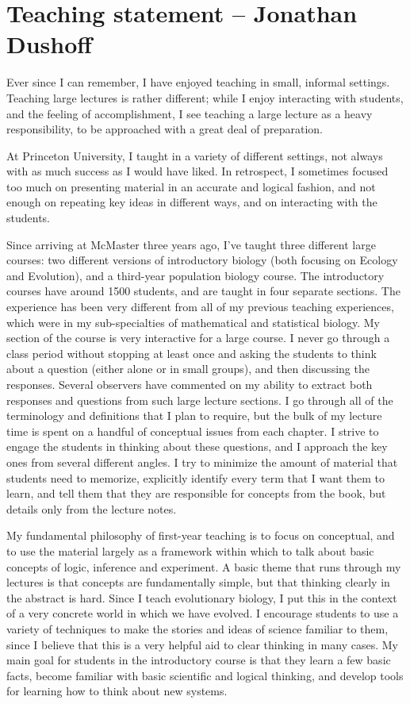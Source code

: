 \documentclass[12pt]{article}
\begin{document}
\section*{Teaching statement -- Jonathan Dushoff }

Ever since I can remember, I have enjoyed teaching in small, informal settings.  
Teaching large lectures is rather different; while I enjoy interacting with students, and the feeling of accomplishment, I see teaching a large lecture as a heavy responsibility, to be approached with a great deal of preparation.

At Princeton University, I taught in a variety of different settings, not always with as much success as I would have liked.
In retrospect, I sometimes focused too much on presenting material in an accurate and logical fashion, and not enough on repeating key ideas in different ways, and on interacting with the students.

Since arriving at McMaster three years ago, I've taught three different large courses: two different versions of introductory biology (both focusing on Ecology and Evolution), and a third-year population biology course.  
The introductory courses have around 1500 students, and are taught in four separate sections.  The experience has been very different from all of my previous teaching experiences, which were in my sub-specialties of mathematical and statistical biology.  
My section of the course is very interactive for a large course.
I never go through a class period without stopping at least once and asking the students to think about a question (either alone or in small groups), and then discussing the responses.
Several observers have commented on my ability to extract both responses and questions from such large lecture sections.
I go through all of the terminology and definitions that I plan to require, but the bulk of my lecture time is spent on a handful of conceptual issues from each chapter.
I strive to engage the students in thinking about these questions, and I approach the key ones from several different angles.
I try to minimize the amount of material that students need to memorize, explicitly identify every term that I want them to learn, and tell them that they are responsible for concepts from the book, but details only from the lecture notes.

My fundamental philosophy of first-year teaching is to focus on conceptual, and to use the material largely as a framework within which to talk about basic concepts of logic, inference and experiment.  A basic theme that runs through my lectures is that concepts are fundamentally simple, but that thinking clearly in the abstract is hard.  Since I teach evolutionary biology, I put this in the context of a very concrete world in which we have evolved.  I encourage students to use a variety of techniques to make the stories and ideas of science familiar to them, since I believe that this is a very helpful aid to clear thinking in many cases.  My main goal for students in the introductory course is that they learn a few basic facts, become familiar with basic scientific and logical thinking, and develop tools for learning how to think about new systems.
\end{document}
